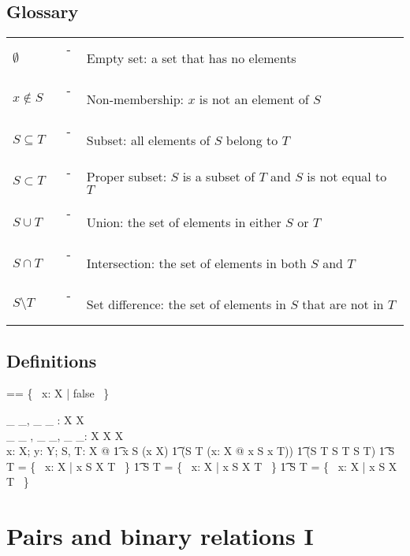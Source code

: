\documentclass{article}
\begin{document}
\subsection*{Glossary}

\begin{tabular}{l c l}
$\emptyset$ & ~-~ & Empty set: a set that has no elements \\
$x \notin S$ & ~-~ & Non-membership: $x$ is not an element of $S$ \\
$S \subseteq T$ & ~-~ & Subset: all elements of $S$ belong to $T$ \\
$S \subset T$ & ~-~ & Proper subset: $S$ is a subset of $T$ and $S$ is not equal to $T$ \\
$S \cup T$ & ~-~ & Union: the set of elements in either $S$ or $T$ \\
$S \cap T$ & ~-~ & Intersection: the set of elements in both $S$ and $T$ \\
$S \setminus T$ & ~-~ & Set difference: the set of elements in $S$ that are not in $T$ \\
\end{tabular}

\subsection*{Definitions}

\begin{zed} \emptyset[X] == \{~ x: X | false ~\} \end{zed}

\begin{gendef}[X]
	\_ \subseteq \_, \_ \subset \_ : \power X \rel \power X \\ 
   	\_ \cup \_ , \_ \cap \_, \_ \setminus \_: \power X \cross \power X \fun \power X \\
\where
	\forall x: X; y: Y; S, T: \power X @ 
\also
\t1	x \notin S \iff \lnot (x \in X) \land
\also
\t1	(S \subseteq T \iff (\forall x: X @ x \in S \implies x \in T)) \land
\also
\t1	(S \subset T \iff S \subseteq T \land S \neq T) \land
\also 
\t1	S \cup T = \{~ x: X | x \in S \lor X \in T ~\} \land
\also 
\t1	S \cap T = \{~ x: X | x \in S \land X \in T ~\} \land
\also 
\t1	S \setminus T = \{~ x: X | x \in S \land X \notin T ~\}
\also
\end{gendef}

\newpage

\section*{Pairs and binary relations I}
\end{document}
